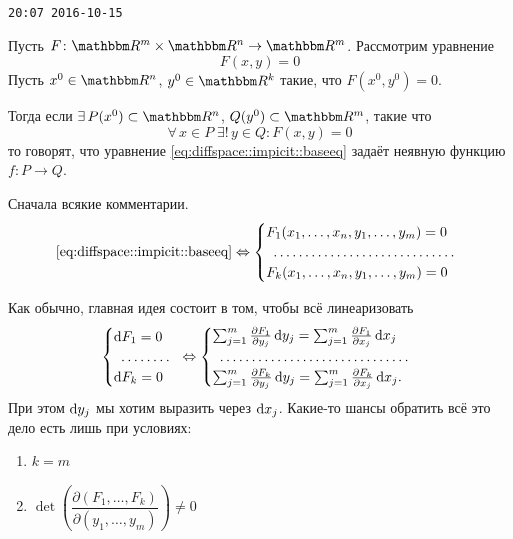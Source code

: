 \documentclass[12pt,timbord]{../../../notes}
\begin{document}
\verb+20:07 2016-10-15+

\begin{defn}\label{defn:diffspace::implicit}
  Пусть $F \colon \R^m\times\R^n \to \R^m$. Рассмотрим уравнение
  \begin{equation}
    F(x, y) = 0
    \label{eq:diffspace::impicit::baseeq}
  \end{equation}
  Пусть $x^0\in \R^n$, $y^0\in \R^k$ такие, что $F(x^0, y^0) = 0$.
 
  Тогда если $\exists\,P(x^0) \subset \R^n$, $Q(y^0) \subset \R^m$, такие что
  \[
    \forall\, x\in P \; \exists!\, y\in Q \colon F(x,y) = 0
  \]
  то говорят, что уравнение \eqref{eq:diffspace::impicit::baseeq} задаёт неявную функцию 
  $f\colon P \to Q$.
\end{defn}

Сначала всякие комментарии.
\begin{equation*}
  \text{\eqref{eq:diffspace::impicit::baseeq}} \Leftrightarrow
  \begin{cases}
    F_1(x_1, \dotsc, x_n, y_1, \dotsc, y_m) = 0 \\
    \hdotsfor{1}\\
    F_k(x_1, \dotsc, x_n, y_1, \dotsc, y_m) = 0 \\
  \end{cases}
\end{equation*}

Как обычно, главная идея состоит в том, чтобы всё линеаризовать
\begin{equation}
  \begin{cases}
    \del F_1 = 0 \\
    \hdotsfor{1}\\
    \del F_k = 0 \\
  \end{cases}
  \Leftrightarrow 
  \begin{cases}
    \sum_{j=1}^m \frac{\partial F_1}{\partial y_j}\, \del y_j = 
    \sum_{j=1}^m \frac{\partial F_1}{\partial x_j}\, \del x_j \\
    \hdotsfor{1}\\
    \sum_{j=1}^m \frac{\partial F_k}{\partial y_j}\, \del y_j = 
    \sum_{j=1}^m \frac{\partial F_k}{\partial x_j}\, \del x_j .\\
  \end{cases}\nolinebreak\label{eq:diffspace::impicit::diff}
\end{equation}
При этом $\mathrm{d} y_j$ мы хотим выразить через $\mathrm{d} x_j$.
Какие-то шансы обратить всё это дело есть лишь при условиях:
\begin{enumerate}
  \item $k=m$
  \item $\det \left(\dfrac{\partial(F_1, \dotsc, F_k)}{\partial(y_1, \dotsc, y_m)}\right) \neq 0$
\end{enumerate}
\end{document}
